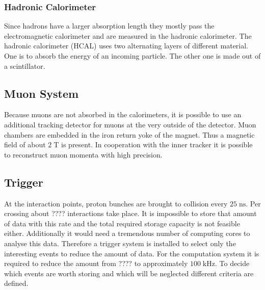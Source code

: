 \subsubsection{Hadronic Calorimeter}
	Since hadrons have a larger absorption length they mostly pass the electromagnetic calorimeter and are measured in the hadronic calorimeter. The hadronic calorimeter (HCAL) uses two alternating layers of different material. One is to absorb the energy of an incoming particle. The other one is made out of a scintillator.
	
 
\subsection{Muon System}
\label{sec:muonsystem}
	Because muons are not absorbed in the calorimeters, it is possible to use an additional tracking detector for muons at the very outside of the detector. Muon chambers are embedded in the iron return yoke of the magnet. Thus a magnetic field of about $2\;\text{T}$ is present.
	In cooperation with the inner tracker it is possible to reconstruct muon momenta with high precision.
\subsection{Trigger}
\label{sec:trigger}
	At the interaction points, proton bunches are brought to collision every $25\;\text{ns}$. Per crossing about ????
	interactions take place. It is impossible to store that amount of data with this rate and the total required storage capacity is not feasible either. Additionally it would need a tremendous number of computing cores to analyse this data. Therefore a trigger system is installed to select only the interesting events to reduce the amount of data. For the computation system it is required to reduce the amount from ???? to approximately $100\;\text{kHz}$.
 	To decide which events are worth storing and which will be neglected different criteria are defined.
	
	